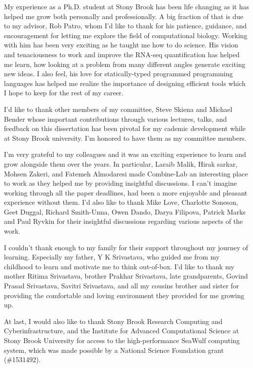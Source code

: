 \documentclass[
11pt, %
english, %
singlespacing, %
headsepline, %
]{main} %
\begin{document}
\begin{acknowledgements}
\addchaptertocentry{\acknowledgementname} %

My experience as a Ph.D. student at Stony Brook has been life changing as it has helped me 
grow both personally and professionally. A big fraction of that is due to my advisor, 
Rob Patro, whom I'd like to thank for his patience, guidance, and encouragement for letting 
me explore the field of computational biology.
Working with him has been very exciting as he taught me how to do science. His vision 
and tenaciousness to work and improve the RNA-seq quantification has helped me learn, 
how looking at a problem from many different angles generate exciting new ideas. I also 
feel, his love for statically-typed programmed programming languages has helped me realize 
the importance of designing efficient tools which I hope to keep for the rest of my career.

I'd like to thank other members of my committee, Steve Skiena and Michael Bender whose 
important contributions through various lectures, talks, and feedback on this dissertation has 
been pivotal for my cademic development while at Stony Brook university. I'm honored to 
have them as my committee members.

I'm very grateful to my colleagues and it was an exciting experience to learn and grow
alongside them over the years. In particular, Laraib Malik, Hirak sarkar, Mohsen Zakeri, and 
Fatemeh Almodaresi made Combine-Lab an interesting place to work as they helped me by 
providing insightful discussions. I can't imagine working through all the paper deadlines,
had been a more enjoyable and pleasant experience without them. I'd also like to thank Mike Love, 
Charlotte Soneson, Geet Duggal, Richard Smith-Unna, Owen Dando, Darya Filipova, Patrick Marks 
and Paul Ryvkin for their insightful discussions regarding various aspects of the work.

I couldn't thank enough to my family for their support throughout my journey of learning. 
Especially my father, Y K Srivastava, who guided me from my childhood to learn and motivate me 
to think out-of-box. I'd like to thank my mother Ritima Srivastava, brother Prakhar Srivastava,
late grandparents, Govind Prasad Srivastava, Savitri Srivastava, and all my cousins brother and
sister for providing the comfortable and loving environment they provided for me growing up. 

At last, I would also like to thank Stony Brook Research Computing and 
Cyberinfrastructure, and the Institute for Advanced Computational Science at Stony Brook 
University for access to the high-performance SeaWulf computing system, which was made 
possible by a National Science Foundation grant (\#1531492).
\end{acknowledgements}
\end{document}
